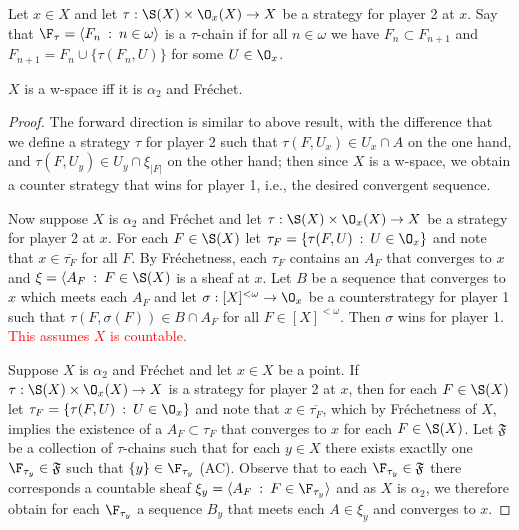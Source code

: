 \documentclass{article}
\begin{document}
\begin{defn}
    Let \(x \in X\) and let \(\tau: \S(X) \times \O_x(X) \to X\) be a strategy for player 2 at \(x\). Say that \(\F_{\tau} = \langle F_n  \: : \: n \in \omega\rangle\) is a \(\tau\)-chain if for all \(n \in \omega\) we have \(F_n \subset F_{n + 1}\) and \(F_{n + 1} = F_n \cup \{\tau(F_n, U)\}\) for some \(U \in \O_x\).
\end{defn}

\begin{prop}
    \(X\) is a w-space iff it is  \(\alpha_2\) and Fréchet.
\end{prop}
\begin{proof}
    The forward direction is similar to above result, with the difference that we define a strategy \(\tau\) for player 2 such that \(\tau(F, U_x) \in U_x \cap A\) on the one hand, and \(\tau(F, U_y) \in U_y \cap \xi_{|F|}\) on the other hand; then since \(X\) is a w-space, we obtain a counter strategy that wins for player 1, i.e., the desired convergent sequence.

    Now suppose \(X\) is \(\alpha_2\) and Fréchet and let \(\tau: \S(X) \times \O_x(X) \to X\) be a strategy for player 2 at \(x\). For each \(F \in \S(X)\) let \(\tau_F = \{\tau(F, U) \: : \: U \in \O_x\}\) and note that \(x \in \overline{\tau_F}\) for all \(F\). By Fréchetness, each \(\tau_F\) contains an \(A_F\) that converges to \(x\) and \(\xi = \langle A_F \: : \: F \in \S(X)\)  is a sheaf at \(x\). Let \(B\) be a sequence that converges to \(x\) which meets each \(A_F\) and let \(\sigma: [X]^{< \omega} \to \O_x\) be a counterstrategy for player 1 such that \(\tau(F, \sigma(F)) \in B \cap A_F\) for all \(F \in [X]^{< \omega}\). Then \(\sigma\) wins for player 1. \textcolor{red}{This assumes $X$ is countable.}

    Suppose \(X\) is \(\alpha_2\) and Fréchet and let \(x \in X\) be a point. If \(\tau: \S(X) \times \O_x(X) \to X\) is a strategy for player 2 at \(x\), then for each \(F \in \S(X)\) let \(\tau_F = \{\tau(F, U) \: : \: U \in \O_x\}\) and note that \(x \in \overline{\tau_F}\), which by Fréchetness of \(X\), implies the existence of a \(A_F \subset \tau_F\) that converges to \(x\)  for each \(F \in \S(X)\). Let \(\mathfrak{F}\) be a collection of \(\tau\)-chains such that for each \(y \in X\) there exists exactlly one \(\F_{\tau_y} \in \mathfrak{F}\) such that \(\{y\} \in \F_{\tau_y}\) (AC). Observe that to each \(\F_{\tau_y} \in\mathfrak{F}\) there corresponds a countable sheaf \(\xi_y = \langle A_F \: : \: F \in \F_{\tau_y}\rangle\) and as \(X\) is \(\alpha_2\), we therefore obtain for each \(\F_{\tau_y}\) a sequence \(B_y\) that meets each \(A \in\xi_y\) and converges to \(x\). 
    

\end{proof}
\end{document}
